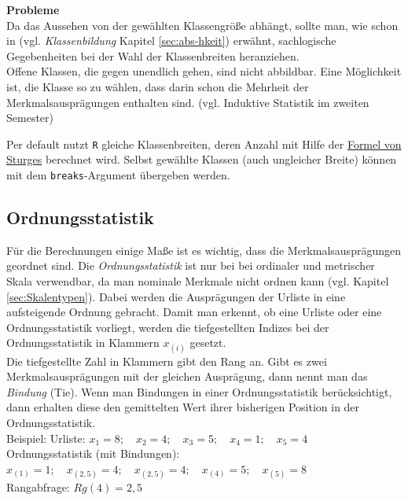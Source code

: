 \documentclass[a4paper]{article}
\newcommand\dangersign{%
 \makebox[1.8em][c]{%
 \makebox[0pt][c]{\raisebox{.15em}{\small!}}%
 \makebox[0pt][c]{\color{red}\Large$\triangle$}}}%
\begin{document}
\noindent \textbf{Probleme}\\
Da das Aussehen von der gewählten Klassengröße abhängt, sollte man, wie schon in (vgl. \textit{Klassenbildung} Kapitel \ref{sec:abs-hkeit})  erwähnt, sachlogische Gegebenheiten bei der Wahl der Klassenbreiten heranziehen.\\
Offene Klassen, die gegen unendlich gehen, sind nicht abbildbar. Eine Möglichkeit ist, die Klasse so zu wählen, dass darin schon die Mehrheit der Merkmalsausprägungen enthalten sind. (vgl. Induktive Statistik im zweiten Semester)\\

\noindent {}

\noindent \dangersign Per default nutzt \texttt{R} gleiche Klassenbreiten, deren Anzahl mit Hilfe der \href{https://en.wikipedia.org/wiki/Histogram#Sturges'_formula}{Formel von Sturges} berechnet wird. Selbst gewählte Klassen (auch ungleicher Breite) können mit dem \texttt{breaks}-Argument übergeben werden.

\subsection{Ordnungsstatistik}

Für die Berechnungen einige Maße ist es wichtig, dass die Merkmalsausprägungen geordnet sind. Die \textit{Ordnungsstatistik} ist nur bei bei ordinaler und metrischer Skala verwendbar, da man nominale Merkmale nicht ordnen kann (vgl. Kapitel \ref{sec:Skalentypen}). Dabei werden die Ausprägungen der Urliste in eine aufsteigende Ordnung gebracht. Damit man erkennt, ob eine Urliste oder eine Ordnungsstatistik vorliegt, werden die tiefgestellten Indizes bei der Ordnungsstatistik in Klammern $x_{(i)}$ gesetzt.\\
Die tiefgestellte Zahl in Klammern gibt den Rang an. Gibt es zwei Merkmalsausprägungen mit der gleichen Ausprägung, dann nennt man das \textit{Bindung} (Tie). Wenn man Bindungen in einer Ordnungsstatistik berücksichtigt, dann erhalten diese den gemittelten Wert ihrer bisherigen Position in der Ordnungsstatistik.\\
Beispiel: Urliste: $x_1=8;\quad x_2=4;\quad x_3=5;\quad x_4=1;\quad x_5=4$\\
Ordnungsstatistik (mit Bindungen): $x_{(1)}=1;\quad x_{(2,5)}=4;\quad x_{(2,5)}=4;\quad x_{(4)}=5;\quad x_{(5)}=8$\\
Rangabfrage: $Rg(4)=2,5$\\
\end{document}
